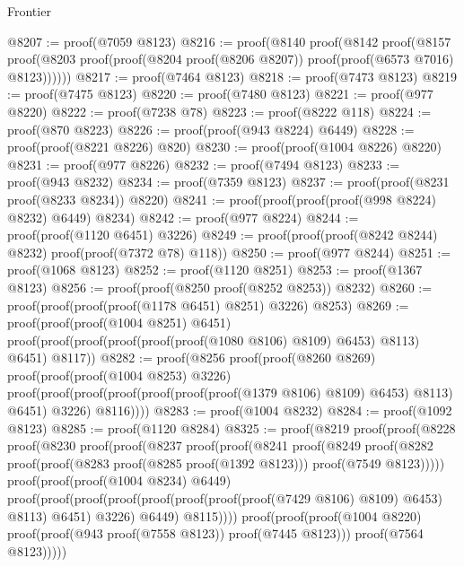 \begin{lexlean}{Frontier}
\begin{coremodule}
@8207 := proof(@7059 @8123)
@8216 := proof(@8140
      proof(@8142
          proof(@8157
              proof(@8203 proof(proof(@8204 proof(@8206 @8207)) proof(proof(@6573 @7016) @8123))))))
@8217 := proof(@7464 @8123)
@8218 := proof(@7473 @8123)
@8219 := proof(@7475 @8123)
@8220 := proof(@7480 @8123)
@8221 := proof(@977 @8220)
@8222 := proof(@7238 @78)
@8223 := proof(@8222 @118)
@8224 := proof(@870 @8223)
@8226 := proof(proof(@943 @8224) @6449)
@8228 := proof(proof(@8221 @8226) @820)
@8230 := proof(proof(@1004 @8226) @8220)
@8231 := proof(@977 @8226)
@8232 := proof(@7494 @8123)
@8233 := proof(@943 @8232)
@8234 := proof(@7359 @8123)
@8237 := proof(proof(@8231 proof(@8233 @8234)) @8220)
@8241 := proof(proof(proof(proof(@998 @8224) @8232) @6449) @8234)
@8242 := proof(@977 @8224)
@8244 := proof(proof(@1120 @6451) @3226)
@8249 := proof(proof(proof(@8242 @8244) @8232) proof(proof(@7372 @78) @118))
@8250 := proof(@977 @8244)
@8251 := proof(@1068 @8123)
@8252 := proof(@1120 @8251)
@8253 := proof(@1367 @8123)
@8256 := proof(proof(@8250 proof(@8252 @8253)) @8232)
@8260 := proof(proof(proof(proof(@1178 @6451) @8251) @3226) @8253)
@8269 := proof(proof(proof(@1004 @8251) @6451)
      proof(proof(proof(proof(proof(proof(@1080 @8106) @8109) @6453) @8113) @6451) @8117))
@8282 := proof(@8256
      proof(proof(@8260 @8269)
          proof(proof(proof(@1004 @8253) @3226)
              proof(proof(proof(proof(proof(proof(proof(@1379 @8106) @8109) @6453) @8113) @6451)
                    @3226)
                  @8116))))
@8283 := proof(@1004 @8232)
@8284 := proof(@1092 @8123)
@8285 := proof(@1120 @8284)
@8325 := proof(@8219
      proof(proof(@8228
            proof(@8230
                proof(proof(@8237
                      proof(proof(@8241
                            proof(@8249
                                proof(@8282
                                    proof(proof(@8283 proof(@8285 proof(@1392 @8123)))
                                        proof(@7549 @8123)))))
                          proof(proof(proof(@1004 @8234) @6449)
                              proof(proof(proof(proof(proof(proof(proof(proof(@7429 @8106) @8109)
                                            @6453)
                                          @8113)
                                        @6451)
                                      @3226)
                                    @6449)
                                  @8115))))
                    proof(proof(proof(@1004 @8220)
                          proof(proof(@943 proof(@7558 @8123)) proof(@7445 @8123)))
                        proof(@7564 @8123)))))

\end{coremodule}
\end{lexlean}
